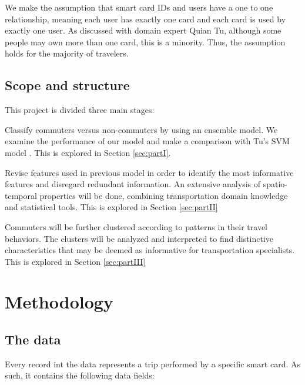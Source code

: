 \documentclass{article}
\begin{document}
We make the assumption that smart card IDs and users have a one to one relationship, meaning each user has exactly one card and each card is used by exactly one user. As discussed with domain expert Quian Tu, although some people may own more than one card, this is a minority. Thus, the assumption holds for the majority of travelers. 

\subsection{Scope and structure}
This project is divided three main stages: 

\begin{description}[align=right,labelwidth=2cm]
\item[PART I] Classify commuters versus non-commuters by using an ensemble model. We examine the performance of our model and make a comparison with Tu's SVM model \cite{tu2016impact}. This is explored in Section \ref{sec:partI}.

\item[PART II] Revise features used in previous model in order to identify the most informative features and disregard redundant information. An extensive analysis of spatio-temporal properties will be done, combining transportation domain knowledge and statistical tools. This is explored in Section \ref{sec:partII}

\item[PART III] Commuters will be further clustered according to patterns in their travel behaviors. The clusters will be analyzed and interpreted to find distinctive characteristics that may be deemed as informative for transportation specialists. This is explored in Section \ref{sec:partIII}
\end{description}


\newpage
\section{Methodology}
\subsection{The data}
\label{sec:data}
Every record int the data represents a trip performed by a specific smart card. As such, it contains the following data fields:
\end{document}
